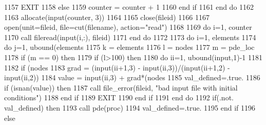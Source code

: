 \begin{DoxyCode}
1157           \textcolor{keywordflow}{EXIT}
1158         \textcolor{keywordflow}{else}
1159           counter = counter + 1
1160 \textcolor{keywordflow}{        end if}
1161 \textcolor{keywordflow}{      end do}
1162       
1163       \textcolor{keyword}{allocate}(input(counter, 3))
1164       
1165       \textcolor{keyword}{close}(fileid)
1166       
1167       \textcolor{keyword}{open}(unit=fileid, file=cut(filename), action=\textcolor{stringliteral}{"read"})
1168       
1169       \textcolor{keywordflow}{do} i=1, counter
1170         \textcolor{keyword}{call }fileread(input(i,:), fileid)
1171 \textcolor{keywordflow}{      end do}
1172 
1173       \textcolor{keywordflow}{do} i=1, elements%
1174         \textcolor{keywordflow}{do} j=1, ubound(elements%
1175           k = elements%
1176           l = nodes%
1177             m = pde\_loc%
1178             \textcolor{keywordflow}{if} (m == 0) \textcolor{keywordflow}{then}
1179               \textcolor{keywordflow}{if} (l>100) \textcolor{keywordflow}{then}
1180                 \textcolor{keywordflow}{do} ii=1, ubound(input,1)-1
1181     
1182                   \textcolor{keywordflow}{if} (nodes%
1183                     grad = (input(ii+1,3) - input(ii,3))/(input(ii+1,2) \textcolor{comment}{- input(ii,2))}
1184 \textcolor{comment}{                    }\textcolor{keywordtype}{value} =  input(ii,3) + grad*(nodes%
1185 \textcolor{comment}{                    val\_defined=.true.}
1186 \textcolor{comment}{                    }\textcolor{keywordflow}{if} (isnan(\textcolor{keywordtype}{value})) \textcolor{keywordflow}{then}
1187                       \textcolor{keyword}{call }file_error(fileid, \textcolor{stringliteral}{"bad input file with initial conditions"}\textcolor{comment}{)}
1188 \textcolor{comment}{}\textcolor{keywordflow}{                    end if}
1189                     \textcolor{keywordflow}{EXIT}
1190 \textcolor{keywordflow}{                   end if}
1191 \textcolor{keywordflow}{                 end do}
1192                  \textcolor{keywordflow}{if}(.not. val\_defined) \textcolor{keywordflow}{then}
1193                    \textcolor{keyword}{call }pde(proc)%
1194 \textcolor{comment}{                   val\_defined=.true.}
1195 \textcolor{comment}{}\textcolor{keywordflow}{                 end if} 
1196               \textcolor{keywordflow}{else}

\end{DoxyCode}

